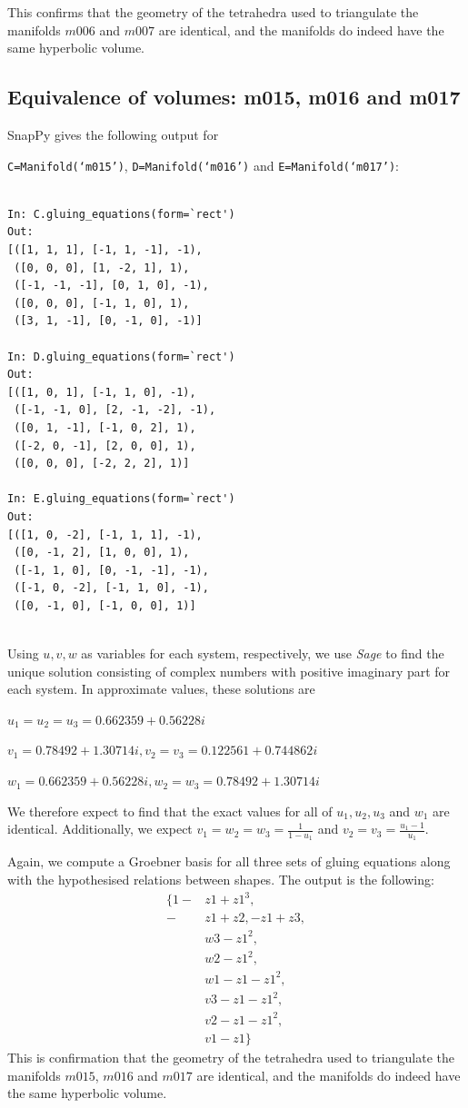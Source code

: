 \documentclass[a4paper]{gtart}
\theoremstyle{definition}
\theoremstyle{remark}
\numberwithin{equation}{section}
\begin{document}
This confirms that the geometry of the tetrahedra used to triangulate the manifolds $m006$ and $m007$ are identical, and the manifolds do indeed have the same hyperbolic volume.

\subsection{Equivalence of volumes: m015, m016 and m017} 

SnapPy gives the following output for 

\texttt{C=Manifold(`m015')}, \texttt{D=Manifold(`m016')} and \texttt{E=Manifold(`m017')}:

\begin{verbatim}

In: C.gluing_equations(form=`rect')
Out: 
[([1, 1, 1], [-1, 1, -1], -1),
 ([0, 0, 0], [1, -2, 1], 1),
 ([-1, -1, -1], [0, 1, 0], -1),
 ([0, 0, 0], [-1, 1, 0], 1),
 ([3, 1, -1], [0, -1, 0], -1)]

In: D.gluing_equations(form=`rect')
Out: 
[([1, 0, 1], [-1, 1, 0], -1),
 ([-1, -1, 0], [2, -1, -2], -1),
 ([0, 1, -1], [-1, 0, 2], 1),
 ([-2, 0, -1], [2, 0, 0], 1),
 ([0, 0, 0], [-2, 2, 2], 1)]

In: E.gluing_equations(form=`rect')
Out: 
[([1, 0, -2], [-1, 1, 1], -1),
 ([0, -1, 2], [1, 0, 0], 1),
 ([-1, 1, 0], [0, -1, -1], -1),
 ([-1, 0, -2], [-1, 1, 0], -1),
 ([0, -1, 0], [-1, 0, 0], 1)]
 
\end{verbatim}

Using $u,v,w$ as variables for each system, respectively, we use \textit{Sage} to find the unique solution consisting of complex numbers with positive imaginary part for each system. In approximate values, these solutions are

$u_1=u_2=u_3=0.662359 +0.56228 i$

$v_1=0.78492 +1.30714 i,v_2=v_3=0.122561 +0.744862 i$

$w_1=0.662359 +0.56228 i,w_2=w_3=0.78492 +1.30714 i$

We therefore expect to find that the exact values for all of $u_1, u_2, u_3$ and $w_1$ are identical. Additionally, we expect $v_1=w_2=w_3=\frac{1}{1-u_1}$ and $v_2=v_3=\frac{u_1-1}{u_1}$.

Again, we compute a Groebner basis for all three sets of gluing equations along with the hypothesised relations between shapes. The output is the following: 
\begin{align*}
    \{1 - &z1 + z1^3,\\
    -&z1 + z2, -z1 + z3,\\
    &w3 - z1^2,\\
    &w2 - z1^2,\\
    &w1 - z1 - z1^2, \\
    &v3 - z1 - z1^2, \\
    &v2 - z1 - z1^2,\\
    &v1 - z1\}
\end{align*}
This is confirmation that the geometry of the tetrahedra used to triangulate the manifolds $m015$, $m016$ and $m017$ are identical, and the manifolds do indeed have the same hyperbolic volume.
\end{document}
